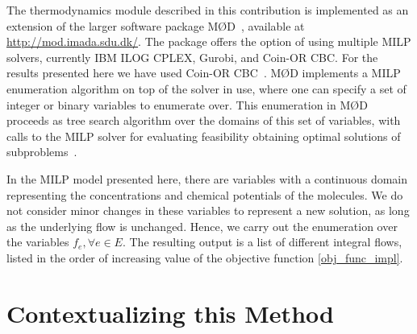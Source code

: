 The thermodynamics module described in this contribution is implemented as an extension of the larger software package M{\O}D~\cite{jakob_software}, available at \url{http://mod.imada.sdu.dk/}.
The package offers the option of using multiple MILP solvers, currently IBM ILOG CPLEX, Gurobi, and Coin-OR CBC.
For the results presented here we have used Coin-OR CBC~\cite{cbc,cbc2}.
M{\O}D implements a MILP enumeration algorithm on top of the solver in use,
where one can specify a set of integer or binary variables to enumerate over.
This enumeration in M{\O}D proceeds as tree search algorithm over the domains of this set of variables,
with calls to the MILP solver for evaluating feasibility obtaining optimal solutions of subproblems~\cite{jakob_integer_hyperflows}.

In the MILP model presented here, there are variables with a continuous domain representing the concentrations and chemical potentials of the molecules.
We do not consider minor changes in these variables to represent a new solution, as long as the underlying flow is unchanged.
Hence, we carry out the enumeration over the variables $f_e,\forall e\in E$.
The resulting output is a list of different integral flows,
listed in the order of increasing value of the objective function \eqref{obj_func_impl}.

\section{Contextualizing this Method}
\label{discussions_method} %

